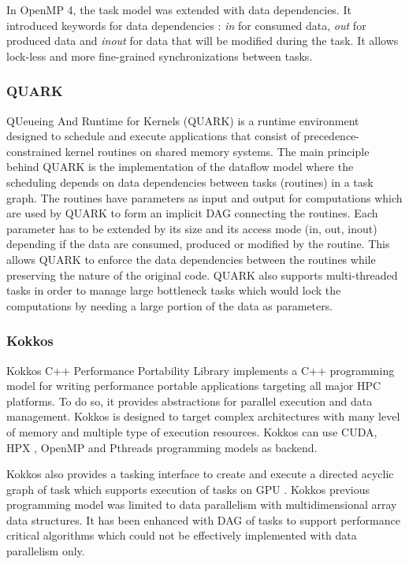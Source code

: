 In OpenMP 4, the task model was extended with data dependencies.
It introduced keywords for data dependencies : \textit{in} for consumed data, \textit{out} for produced data and \textit{inout} for data that will be modified during the task.
It allows lock-less and more fine-grained synchronizations between tasks.

\subsubsection{QUARK}
QUeueing And Runtime for Kernels (QUARK) \cite{YarkKD2011} is a runtime environment designed to schedule and execute applications that consist of precedence-constrained kernel routines on shared memory systems.
The main principle behind QUARK is the implementation of the dataflow model where the scheduling depends on data dependencies between tasks (routines) in a task graph.
The routines have parameters as input and output for computations which are used by QUARK to form an implicit DAG connecting the routines.
Each parameter has to be extended by its size and its access mode (in, out, inout) depending if the data are consumed, produced or modified by the routine.
This allows QUARK to enforce the data dependencies between the routines while preserving the nature of the original code.
QUARK also supports multi-threaded tasks in order to manage large bottleneck tasks which would lock the computations by needing a large portion of the data as parameters.

\subsubsection{Kokkos}
Kokkos C++ Performance Portability Library \cite{CarTS2014} implements a C++ programming model for writing performance portable applications targeting all major HPC platforms.
To do so, it provides abstractions for parallel execution and data management.
Kokkos is designed to target complex architectures with many level of memory and multiple type of execution resources.
Kokkos can use CUDA, HPX \cite{KHASF2014}, OpenMP \cite{DaguM1998} and Pthreads programming models as backend.

Kokkos also provides a tasking interface to create and execute a directed acyclic graph of task which supports execution of tasks on GPU \cite{CartI2017}.
Kokkos previous programming model was limited to data parallelism with multidimensional array data structures.
It has been enhanced with DAG of tasks to support performance critical algorithms which could not be effectively implemented with data parallelism only.

